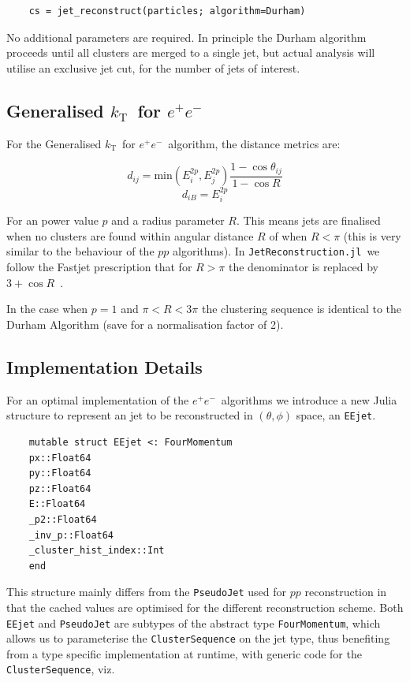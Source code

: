 \documentclass{webofc}
\newcommand{\kt}{${k}_\text{T}$}
\newcommand{\JR}{\texttt{JetReconstruction.jl}}
\newcommand{\ee}{$e^+e^-$}
\begin{document}
\begin{verbatim}
    cs = jet_reconstruct(particles; algorithm=Durham)
\end{verbatim}

No additional parameters are required. In principle the Durham algorithm
proceeds until all clusters are merged to a single jet, but actual analysis will
utilise an exclusive jet cut, for the number of jets of interest.

\subsection{Generalised \kt\ for \ee}
\label{sec:getktee}

For the Generalised \kt\ for \ee\ algorithm, the distance metrics are:

$$
d_{ij} = \text{min}(E_i^{2p}, E_j^{2p}) \frac{1 - \cos \theta_{ij}}{1 - \cos R}
$$
$$
d_{iB} = E_i^{2p}
$$

For an power value $p$ and a radius parameter $R$. This means jets are finalised
when no clusters are found within angular distance $R$ of when $R<\pi$ (this is
very similar to the behaviour of the $pp$ algorithms). In \JR\ we follow the
Fastjet prescription that for $R>\pi$ the denominator is replaced by $3+\cos
R$~\cite{fastjetmanual}.

In the case when $p=1$ and $\pi < R < 3\pi$ the clustering sequence is identical
to the Durham Algorithm (save for a normalisation factor of 2).

\subsection{Implementation Details}
\label{eeimplementation}

For an optimal implementation of the \ee\ algorithms we introduce a new Julia
structure to represent an jet to be reconstructed in $(\theta, \phi)$ space, an \texttt{EEjet}.

\begin{verbatim}
    mutable struct EEjet <: FourMomentum
    px::Float64
    py::Float64
    pz::Float64
    E::Float64
    _p2::Float64
    _inv_p::Float64
    _cluster_hist_index::Int
    end
\end{verbatim}

This structure mainly differs from the \texttt{PseudoJet} used for $pp$
reconstruction in that the cached values are optimised for the different
reconstruction scheme. Both \texttt{EEjet} and \texttt{PseudoJet} are subtypes
of the abstract type \texttt{FourMomentum}, which allows us to parameterise the
\texttt{ClusterSequence} on the jet type, thus benefiting from a type specific
implementation at runtime, with generic code for the \texttt{ClusterSequence}, viz.
\end{document}
